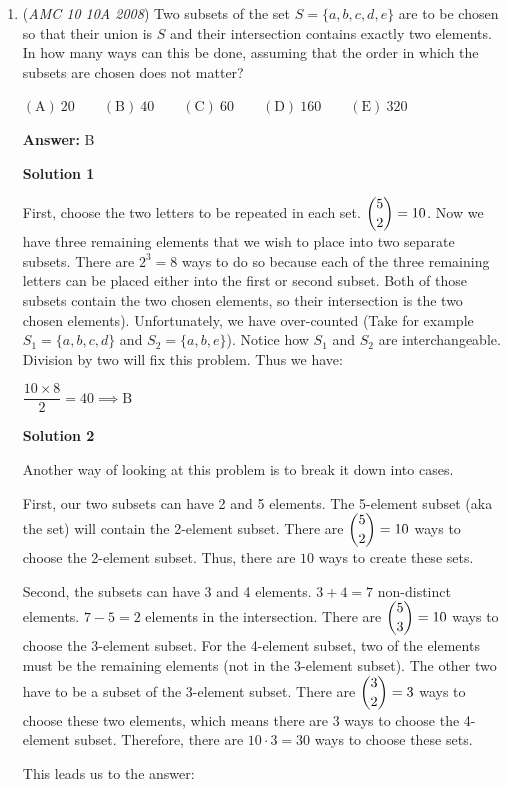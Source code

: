 \begin{enumerate}
 


	\item (\textit{AMC 10 10A 2008}) Two subsets of the set $S=\lbrace a,b,c,d,e\rbrace$ are to be chosen so that their union is $S$ and their intersection contains exactly two elements. In how many ways can this be done, assuming that the order in which the subsets are chosen does not matter?


 $\mathrm{(A)}\ 20\qquad\mathrm{(B)}\ 40\qquad\mathrm{(C)}\ 60\qquad\mathrm{(D)}\ 160\qquad\mathrm{(E)}\ 320$

 \textbf{Answer: }B



\textbf{Solution 1}

First, choose the two letters to be repeated in each set.  $\dbinom{5}{2}=10$.  Now we have three remaining elements that we wish to place into two separate subsets. There are $2^3 = 8$ ways to do so because each of the three remaining letters can be placed either into the first or second subset. Both of those subsets contain the two chosen elements, so their intersection is the two chosen elements). Unfortunately, we have over-counted  (Take for example $S_{1} = \{a,b,c,d \}$ and $S_{2} = \{a,b,e \}$). Notice how $S_{1}$ and $S_{2}$ are interchangeable. Division by two will fix this problem. Thus we have:

 $\dfrac{10 \times 8}{2} = 40 \implies \boxed{\text{B}}$




\textbf{Solution 2}

Another way of looking at this problem is to break it down into cases.

 First, our two subsets can have 2 and 5 elements. The 5-element subset (aka the set) will contain the 2-element subset. There are $\dbinom{5}{2}=10$ ways to choose the 2-element subset. Thus, there are $10$ ways to create these sets.

 
Second, the subsets can have 3 and 4 elements. $3+4=7$ non-distinct elements. $7-5=2$ elements in the intersection. There are $\dbinom{5}{3}=10$ ways to choose the 3-element subset. For the 4-element subset, two of the elements must be the remaining elements (not in the 3-element subset). The other two have to be a subset of the 3-element subset. There are $\dbinom{3}{2}=3$ ways to choose these two elements, which means there are 3 ways to choose the 4-element subset. Therefore, there are $10\cdot3=30$ ways to choose these sets.

 
This leads us to the answer:


\end{enumerate}

